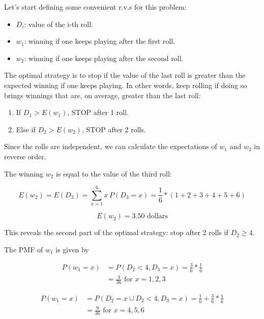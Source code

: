 Let's start defining some convenient r.v.s for this problem:

\begin{itemize}
    \item $D_i$: value of the i-th roll.
    \item $w_1$: winning if one keeps playing after the first roll.
    \item $w_2$: winning if one keeps playing after the second roll.
\end{itemize}


The optimal strategy is to stop if the value of the last roll is greater than the expected winning if one keeps playing.
In other words, keep rolling if doing so brings winnings that are, on average, greater than the last roll:

\begin{enumerate}
\item If $D_1 > E(w_1)$, STOP after 1 roll.

\item Else if $D_2 > E(w_2)$, STOP after 2 rolls.
\end{enumerate}


Since the rolls are independent, we can calculate the expectations of $w_1$ and $w_2$ in reverse order.

The winning $w_2$ is equal to the value of the third roll:

$$E(w_2) = E(D_3) = \sum_{x=1}^6 x \, P(D_3=x) = \frac{1}{6} * (1+2+3+4+5+6)$$

$$E(w_2) = 3.50 \text{ dollars}$$


This reveals the second part of the optimal strategy: stop after 2 rolls if $D_2 \ge 4$.


The PMF of $w_1$ is given by

\begin{equation*}
\begin{split}
    P(w_1=x) & = P(D_2<4, D_3=x) = \frac{3}{6} * \frac{1}{6}\\
    & = \frac{3}{36} \text{ for } x=1,2,3
\end{split}
\end{equation*}

\begin{equation*}
\begin{split}
    P(w_1=x) & = P(D_2=x \cup D_2<4,D_3=x) = \frac{1}{6} + \frac{3}{6} * \frac{1}{6}\\
    & = \frac{9}{36} \text{ for } x=4,5,6
\end{split}
\end{equation*}


